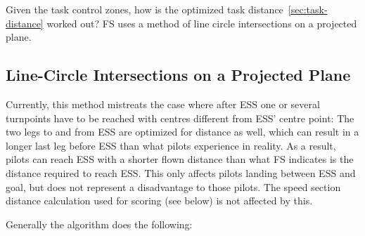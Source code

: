 \label{sec:shortest-route}
Given the task control zones, how is the optimized task
distance~\ref{sec:task-distance} worked out? FS uses a method of line circle
intersections on a projected plane.

\subsection{Line-Circle Intersections on a Projected Plane}
Currently, this method mistreats the case where after ESS one or several
turnpoints have to be reached with centres different from ESS’ centre point:
The two legs to and from ESS are optimized for distance as well, which can
result in a longer last leg before ESS than what pilots experience in reality.
As a result, pilots can reach ESS with a shorter flown distance than what FS
indicates is the distance required to reach ESS. This only affects pilots
landing between ESS and goal, but does not represent a disadvantage to those
pilots. The speed section distance calculation used for scoring (see below) is
not affected by this.

Generally the algorithm does the following:

